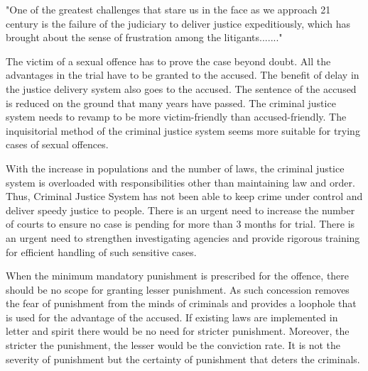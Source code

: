 \begin{multicols}{2}
\noi
"One of the greatest challenges that stare us in the face as we approach 21 century is
the failure of the judiciary to deliver justice expeditiously, which has brought about the
sense of frustration among the litigants......."

\noi
The victim of a sexual offence has to prove the case beyond doubt. All the advantages
in the trial have to be granted to the accused. The benefit of delay in the justice delivery
system also goes to the accused. The sentence of the accused is reduced on the ground
that many years have passed. The criminal justice system needs to revamp to be more
victim-friendly than accused-friendly. The inquisitorial method of the criminal justice
system seems more suitable for trying cases of sexual offences.

\noi
With the increase in populations and the number of laws, the criminal justice system is
overloaded with responsibilities other than maintaining law and order. Thus, Criminal
Justice System has not been able to keep crime under control and deliver speedy justice
to people. There is an urgent need to increase the number of courts to ensure no case is
pending for more than 3 months for trial. There is an urgent need to strengthen
investigating agencies and provide rigorous training for efficient handling of such
sensitive cases.

\noi
When the minimum mandatory punishment is prescribed for the offence, there should
be no scope for granting lesser punishment. As such concession removes the fear of
punishment from the minds of criminals and provides a loophole that is used for the
advantage of the accused. If existing laws are implemented in letter and spirit there
would be no need for stricter punishment. Moreover, the stricter the punishment, the
lesser would be the conviction rate. It is not the severity of punishment but the certainty
of punishment that deters the criminals.

\end{multicols}




\label{end2016-art1}
